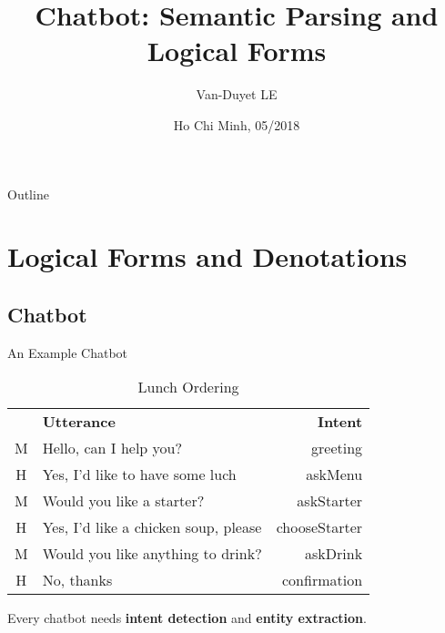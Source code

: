 \documentclass{beamer}
\title{Chatbot: Semantic Parsing and Logical Forms}
\author{Van-Duyet LE}
\date{Ho Chi Minh, 05/2018}
\begin{document}
\begin{frame}
  \titlepage
\end{frame}

\begin{frame}{Outline}
  \tableofcontents
\end{frame}

\section{Logical Forms and Denotations}

\subsection{Chatbot}

\begin{frame}{An Example Chatbot}

    \begin{example}
    
        \begin{table}[]
        \centering
        \caption{Lunch Ordering}
        \label{lunch-ordering}
        \begin{tabular}{clr}
          & \textbf{Utterance}                   & \textbf{Intent} \\
        M & Hello, can I help you?               & greeting        \\
        H & Yes, I'd like to have some luch      & askMenu         \\
        M & Would you like a starter?            & askStarter      \\
        H & Yes, I'd like a chicken soup, please & chooseStarter   \\
        M & Would you like anything to drink?    & askDrink        \\
        H & No, thanks                           & confirmation   
        \end{tabular}
        \end{table}
        
    \pause
    \end{example}
    
    
    Every chatbot needs \textbf{intent detection} and \textbf{entity extraction}.

\end{frame}
\end{document}
